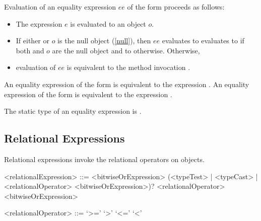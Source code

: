 \documentclass[makeidx]{article}
\begin{document}
{\LMHash{}%
Evaluation of an equality expression $ee$ of the form
proceeds as follows:
\begin{itemize}
\item The expression $e$ is evaluated to an object $o$.
\item If either \THIS{} or $o$ is the null object (\ref{null}),
  then $ee$ evaluates to evaluates to \TRUE{}
  if both \THIS{} and $o$ are the null object
  and to \FALSE{} otherwise.
Otherwise,
\item evaluation of $ee$ is equivalent to the method invocation
  .
\end{itemize}


\LMHash{}%
An equality expression of the form  is equivalent to
the expression .
An equality expression of the form  is equivalent to
the expression .


\LMHash{}%
The static type of an equality expression is .


\subsection{Relational Expressions}

\LMHash{}%
Relational expressions invoke the relational operators on objects.

\begin{grammar}
<relationalExpression> ::= <bitwiseOrExpression> \gnewline{}
  (<typeTest> | <typeCast> | <relationalOperator> <bitwiseOrExpression>)?
  \alt \SUPER{} <relationalOperator> <bitwiseOrExpression>

<relationalOperator> ::= `>='
  \alt `>'
  \alt `<='
  \alt `<'
\end{grammar}

}
\end{document}
